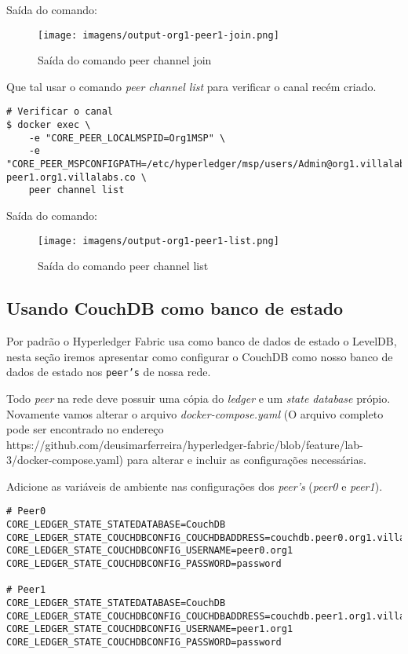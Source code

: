 \documentclass[a4paper,11pt]{article}
\begin{document}
Saída do comando:
\begin{figure}[H]
  \centering
  \texttt{[image: imagens/output-org1-peer1-join.png]}
  \caption{Saída do comando peer channel join}
\end{figure}

Que tal usar o comando \textit{peer channel list} para verificar o canal recém criado.
\begin{lstlisting}
# Verificar o canal
$ docker exec \
    -e "CORE_PEER_LOCALMSPID=Org1MSP" \
    -e "CORE_PEER_MSPCONFIGPATH=/etc/hyperledger/msp/users/Admin@org1.villalabs.co/msp" peer1.org1.villalabs.co \
    peer channel list
\end{lstlisting}

Saída do comando:
\begin{figure}[H]
  \centering
  \texttt{[image: imagens/output-org1-peer1-list.png]}
  \caption{Saída do comando peer channel list}
\end{figure}

\subsection{Usando CouchDB como banco de estado}
Por padrão o Hyperledger\cite{hyperledger} Fabric\cite{hyperledgerfabric} usa como banco de dados de estado o LevelDB, nesta seção iremos apresentar como configurar o CouchDB como nosso banco de dados de estado nos \texttt{peer's} de nossa rede.

Todo \textit{peer} na rede deve possuir uma cópia do \textit{ledger} e um \textit{state database} própio. Novamente vamos alterar o arquivo \textit{docker-compose.yaml} (O arquivo completo pode ser encontrado no endereço https://github.com/deusimarferreira/hyperledger-fabric/blob/feature/lab-3/docker-compose.yaml) para alterar e incluir as configurações necessárias.

Adicione as variáveis de ambiente nas configurações dos \textit{peer's} (\textit{peer0} e \textit{peer1}).
\begin{lstlisting}
# Peer0
CORE_LEDGER_STATE_STATEDATABASE=CouchDB
CORE_LEDGER_STATE_COUCHDBCONFIG_COUCHDBADDRESS=couchdb.peer0.org1.villalabs.co:5984
CORE_LEDGER_STATE_COUCHDBCONFIG_USERNAME=peer0.org1
CORE_LEDGER_STATE_COUCHDBCONFIG_PASSWORD=password

# Peer1
CORE_LEDGER_STATE_STATEDATABASE=CouchDB
CORE_LEDGER_STATE_COUCHDBCONFIG_COUCHDBADDRESS=couchdb.peer1.org1.villalabs.co:5984
CORE_LEDGER_STATE_COUCHDBCONFIG_USERNAME=peer1.org1
CORE_LEDGER_STATE_COUCHDBCONFIG_PASSWORD=password
\end{lstlisting}
\end{document}
